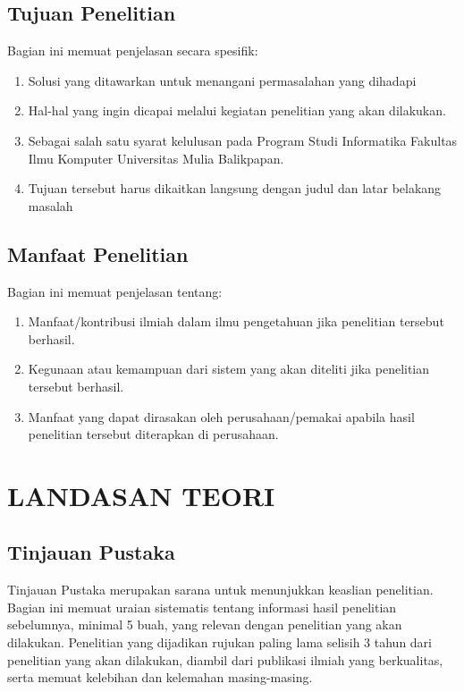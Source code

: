 \documentclass[oneside,listof=totoc]{scrbook}
\begin{document}
\section{Tujuan Penelitian}
Bagian ini memuat penjelasan secara spesifik:

\begin{enumerate}[label=\alph*.]
  \item Solusi yang ditawarkan untuk menangani permasalahan yang dihadapi
  \item Hal-hal yang ingin dicapai melalui kegiatan penelitian yang akan dilakukan.
  \item Sebagai salah satu syarat kelulusan pada Program Studi Informatika Fakultas Ilmu Komputer Universitas Mulia Balikpapan.
  \item Tujuan tersebut harus dikaitkan langsung dengan judul dan latar belakang masalah
\end{enumerate}

\section{Manfaat Penelitian}
Bagian ini memuat penjelasan tentang:

\begin{enumerate}[label=\alph*.]
  \item Manfaat/kontribusi ilmiah dalam ilmu pengetahuan jika penelitian tersebut berhasil.
  \item Kegunaan atau kemampuan dari sistem yang akan diteliti jika penelitian tersebut berhasil.
  \item Manfaat yang dapat dirasakan oleh perusahaan/pemakai apabila hasil penelitian tersebut diterapkan di perusahaan.
\end{enumerate}

\chapter{LANDASAN TEORI}

\vspace{0.5cm}

\section{Tinjauan Pustaka}
Tinjauan Pustaka merupakan sarana untuk menunjukkan keaslian penelitian. Bagian ini memuat uraian sistematis tentang informasi hasil penelitian sebelumnya, minimal 5 buah, yang relevan dengan penelitian yang akan dilakukan. Penelitian yang dijadikan rujukan paling lama selisih 3 tahun dari penelitian yang akan dilakukan, diambil dari publikasi ilmiah yang berkualitas, serta memuat kelebihan dan kelemahan masing-masing.
\end{document}
